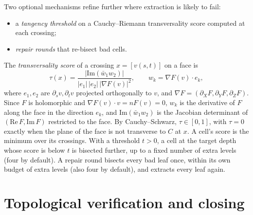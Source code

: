 \documentclass[11pt]{article}
\theoremstyle{plain}
\theoremstyle{definition}
\theoremstyle{remark}
\begin{document}
Two optional mechanisms refine further where extraction is likely to
fail:
\begin{itemize}[itemsep=1pt]
\item a \emph{tangency threshold} on a Cauchy--Riemann transversality
  score computed at each crossing;
\item \emph{repair rounds} that re-bisect bad cells.
\end{itemize}

The \emph{transversality score} of a crossing $x=[v(s,t)]$ on a face is
\[
  \tau(x)=\frac{|\mathrm{Im}(\bar w_1 w_2)|}{|e_1|\,|e_2|\,|\nabla F(v)|^2},\qquad
  w_k=\nabla F(v)\cdot e_k,
\]
where $e_1,e_2$ are $\partial_sv,\partial_tv$ projected orthogonally to $v$,
and $\nabla F=(\partial_XF,\partial_YF,\partial_ZF)$. Since $F$ is
holomorphic and $\nabla F(v)\cdot v=nF(v)=0$, $w_k$ is the derivative of
$F$ along the face in the direction $e_k$, and $\mathrm{Im}(\bar w_1w_2)$ is the Jacobian determinant of
$(\mathrm{Re}\,F,\mathrm{Im}\,F)$ restricted to the face. By
Cauchy--Schwarz, $\tau\in[0,1]$, with $\tau=0$ exactly when the plane of
the face is not transverse to $C$ at $x$. A cell's score is the minimum
over its crossings. With a threshold $t>0$, a cell at the target depth
whose score is below $t$ is bisected further, up to a fixed number of
extra levels (four by default). A repair round bisects every bad leaf
once, within its own budget of extra levels (also four by default), and
extracts every leaf again.

\section{Topological verification and closing}
\label{sec:topology}
\end{document}

